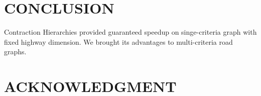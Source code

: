 

\section{CONCLUSION}
Contraction Hierarchies provided guaranteed speedup on singe-criteria graph
with fixed highway dimension. We brought its advantages to multi-criteria 
road graphs.


\section*{ACKNOWLEDGMENT}










